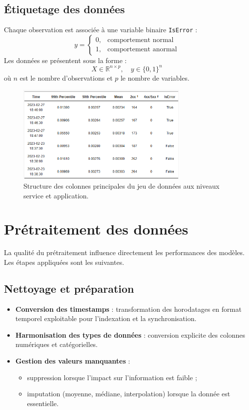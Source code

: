 \documentclass[a4paper,12pt]{report}
\begin{document}
\subsection*{Étiquetage des données}

Chaque observation est associée à une variable binaire \texttt{IsError} :
\[
y =
\begin{cases}
0, & \text{comportement normal} \\
1, & \text{comportement anormal}
\end{cases}
\]
Les données se présentent sous la forme :
\[
X \in \mathbb{R}^{n \times p}, \quad y \in \{0,1\}^n
\]
où $n$ est le nombre d’observations et $p$ le nombre de variables.

\begin{figure}[H]
\centering
\includegraphics[width=0.75\textwidth]{images/dataset_schema.png}
\caption{Structure des colonnes principales du jeu de données aux niveaux service et application.}
\label{fig:dataset}
\end{figure}

\section{Prétraitement des données}

La qualité du prétraitement influence directement les performances des modèles. Les étapes appliquées sont les suivantes.

\subsection*{Nettoyage et préparation}
\begin{itemize}
    \item \textbf{Conversion des timestamps} : transformation des horodatages en format temporel exploitable pour l’indexation et la synchronisation.
    \item \textbf{Harmonisation des types de données} : conversion explicite des colonnes numériques et catégorielles.
    \item \textbf{Gestion des valeurs manquantes} :
    \begin{itemize}
        \item suppression lorsque l’impact sur l’information est faible ;
        \item imputation (moyenne, médiane, interpolation) lorsque la donnée est essentielle.
    \end{itemize}
\end{itemize}
\end{document}
